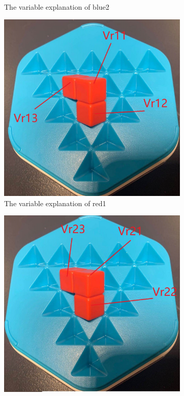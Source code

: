 \begin{figure}[htbp]
\begin{subfigure}[b]{.24\textwidth}
\caption{The variable explanation of blue2}
  \label{fig:3Dblue2}
\end{subfigure}
\begin{subfigure}[b]{.24\textwidth}
\centering
\includegraphics[width=\textwidth]{figs/3Dred1.jpg}
\caption{The variable explanation of red1}
  \label{fig:3Dred1}
\end{subfigure}
\begin{subfigure}[b]{.24\textwidth}
\centering
\includegraphics[width=\textwidth]{figs/3Dred2.jpg}

\end{subfigure}
\end{figure}
